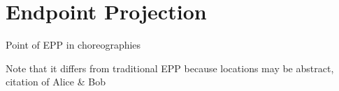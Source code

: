 \section{Endpoint Projection}
\label{sec:endpoint-projection}

\todo Point of EPP in choreographies

\todo Note that it differs from traditional EPP because locations may be abstract, citation of Alice \& Bob 





